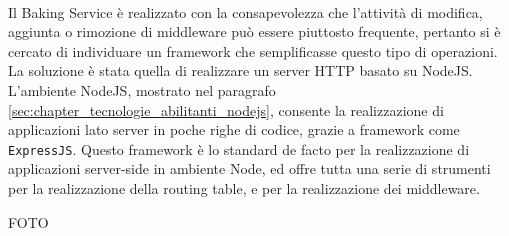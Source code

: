 \\
Il Baking Service è realizzato con la consapevolezza che l’attività di modifica, aggiunta o rimozione di middleware può essere piuttosto frequente, pertanto si è cercato di individuare un framework che semplificasse questo tipo di operazioni. La soluzione è stata quella di realizzare un server HTTP basato su NodeJS. 
L’ambiente NodeJS, mostrato nel paragrafo \ref{sec:chapter_tecnologie_abilitanti_nodejs}, consente la realizzazione di applicazioni lato server in poche righe di codice, grazie a framework come \texttt{ExpressJS}. Questo framework è lo standard de facto per la realizzazione di applicazioni server-side in ambiente Node, ed offre tutta una serie di strumenti per la realizzazione della routing table, e per la realizzazione dei middleware. 

FOTO

